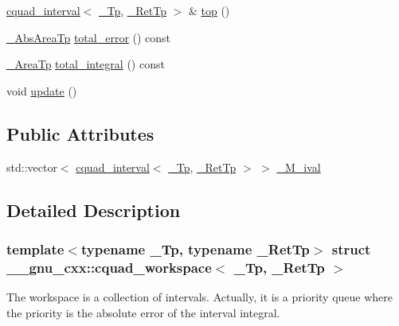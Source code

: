 \begin{DoxyCompactItemize}
\item 
\hyperlink{struct____gnu__cxx_1_1cquad__interval}{cquad\+\_\+interval}$<$ \hyperlink{namespace____gnu__cxx_a3b19a9c800ca194374ef9172290f7d79}{\+\_\+\+Tp}, \hyperlink{namespace____gnu__cxx_a886e03ece3d53ff7fa6c098a40f93fa5}{\+\_\+\+Ret\+Tp} $>$ \& \hyperlink{struct____gnu__cxx_1_1cquad__workspace_a6045595044796357d25adb9a12119b30}{top} ()
\item 
\hyperlink{struct____gnu__cxx_1_1cquad__workspace_a7abfe6354869dc61f6109c9e807ec152}{\+\_\+\+Abs\+Area\+Tp} \hyperlink{struct____gnu__cxx_1_1cquad__workspace_a9eb68447dc880ef6de7cd695d7e223ae}{total\+\_\+error} () const
\item 
\hyperlink{struct____gnu__cxx_1_1cquad__workspace_a8eede64f10ac7bbf817992cd3d06fa8f}{\+\_\+\+Area\+Tp} \hyperlink{struct____gnu__cxx_1_1cquad__workspace_aa429f45aacd05932104d5f91e6a0ff43}{total\+\_\+integral} () const
\item 
void \hyperlink{struct____gnu__cxx_1_1cquad__workspace_a40032babd2a04f33cd7c37d9c80d1d50}{update} ()
\end{DoxyCompactItemize}
\subsection*{Public Attributes}
\begin{DoxyCompactItemize}
\item 
std\+::vector$<$ \hyperlink{struct____gnu__cxx_1_1cquad__interval}{cquad\+\_\+interval}$<$ \hyperlink{namespace____gnu__cxx_a3b19a9c800ca194374ef9172290f7d79}{\+\_\+\+Tp}, \hyperlink{namespace____gnu__cxx_a886e03ece3d53ff7fa6c098a40f93fa5}{\+\_\+\+Ret\+Tp} $>$ $>$ \hyperlink{struct____gnu__cxx_1_1cquad__workspace_a46edeb05c52f2a406dc582b404fe83e6}{\+\_\+\+M\+\_\+ival}
\end{DoxyCompactItemize}


\subsection{Detailed Description}
\subsubsection*{template$<$typename \+\_\+\+Tp, typename \+\_\+\+Ret\+Tp$>$\newline
struct \+\_\+\+\_\+gnu\+\_\+cxx\+::cquad\+\_\+workspace$<$ \+\_\+\+Tp, \+\_\+\+Ret\+Tp $>$}

The workspace is a collection of intervals. Actually, it is a priority queue where the priority is the absolute error of the interval integral. 

